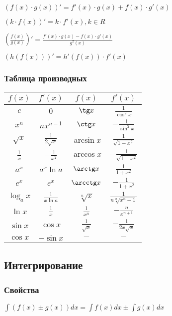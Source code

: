 $ (f(x)\cdot g(x))' = f'(x)\cdot g(x) + f(x)\cdot g'(x) $

$ (k\cdot f(x))' = k\cdot f'(x), k \in R $

$ \left(\frac{f(x)}{g(x)}\right)' = \frac{f'(x)\cdot g(x) - f(x)\cdot g'(x)}{g^2(x)} $

$ (h(f(x)))' = h'(f(x)) \cdot f'(x) $

\subsubsection{Таблица производных}

\begin{tabu}[t]{||c|c||c|c||}
	\hline
		$ f(x) $ & $ f'(x) $ & $ f(x) $ &  $ f'(x) $ \\
	\hline
		$ c $ & $ 0 $ & $ \tg x $ &  $ \frac{1}{\cos^2 x} $ \\
	\hline
		$ x^n $ & $ nx^{n-1} $ & $ \ctg x $ &  $ -\frac{1}{\sin^2 x} $ \\
	\hline
		$ \sqrt{x} $ & $ \frac{1}{2\sqrt{x}} $ & $ \arcsin x $ &  $ \frac{1}{\sqrt{1-x^2}} $ \\
	\hline
		$ \frac{1}{x} $ & $ -\frac{1}{x^2} $ & $ \arccos x $ &  $ -\frac{1}{\sqrt{1-x^2}} $ \\
	\hline
		$ a^x $ & $ a^x \ln a $ & $ \arctg x $ &  $ \frac{1}{1+x^2} $ \\
	\hline
		$ e^x $ & $ e^x $ & $ \arcctg x $ &  $ -\frac{1}{1+x^2} $ \\
	\hline
		$ \log_a x $ & $ \frac{1}{x \ln a} $ & $ \sqrt[n]{x} $ &  $ \frac{1}{n\sqrt[n]{x^n-1}} $ \\
	\hline
		$ \ln x $ & $ \frac{1}{x} $ & $ \frac{1}{x^n} $ &  $ -\frac{n}{x^{n+1}} $ \\
	\hline
		$ \sin x $ & $ \cos x $ & $ \frac{1}{\sqrt{x}} $ &  $ -\frac{1}{2x\sqrt{x}} $ \\
	\hline
		$ \cos x $ & $ -\sin x $ & $ - $ &  $ - $ \\
	\hline
\end{tabu}

\subsection{Интегрирование}

\subsubsection{Свойства}

$ \int (f(x) \pm g(x)) dx = \int f(x) dx \pm \int g(x) dx $

